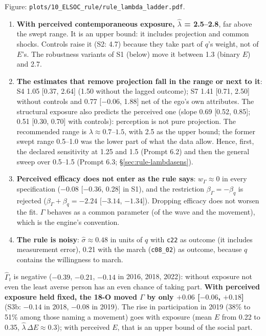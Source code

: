 \documentclass[11pt,a4paper]{article}
\newcommand{\code}[1]{\texttt{#1}}
\begin{document}
\begin{center}
\scriptsize
\setlength{\tabcolsep}{3pt}

\end{center}
\noindent Figure: \code{plots/10\_ELSOC\_rule/rule\_lambda\_ladder.pdf}.
\begin{enumerate}
  \item \textbf{With perceived contemporaneous exposure, $\hat\lambda$ = 2.5--2.8}, far above the swept range.
    It is an upper bound: it includes projection and common shocks. Controls raise it (S2: 4.7) because they
    take part of $q$'s weight, not of $E$'s. The robustness variants of S1 (below) move it between 1.3
    (binary $E$) and 2.7.
  \item \textbf{The estimates that remove projection fall in the range or next to it}: S4 1.05 [0.37, 2.64]
    (1.50 without the lagged outcome); S7 1.41 [0.71, 2.50] without controls and 0.77 [$-$0.06, 1.88] net
    of the ego's own attributes. The structural exposure also predicts the perceived one (slope 0.69
    [0.52, 0.85]; 0.51 [0.30, 0.70] with controls): perception is not pure projection. The recommended
    range is $\lambda \approx 0.7$--$1.5$, with 2.5 as the upper bound; the former swept range 0.5--1.0 was the
    lower part of what the data allow. Hence, first, the declared sensitivity at 1.25 and 1.5 (Prompt 6.2) and
    then the general sweep over 0.5--1.5 (Prompt 6.3; \S\ref{sec:rule-lambdasens}).
  \item \textbf{Perceived efficacy does not enter as the rule says}: $\hat w_\Gamma \approx 0$ in every
    specification ($-0.08$ [$-0.36$, 0.28] in S1), and the restriction $\beta_\Gamma = -\beta_q$ is rejected
    ($\beta_\Gamma + \beta_q = -2.24$ [$-3.14$, $-1.34$]). Dropping efficacy does not worsen the fit.
    $\Gamma$ behaves as a common parameter (of the wave and the movement), which is the engine's
    convention.
  \item \textbf{The rule is noisy}: $\hat\sigma \approx 0.48$ in units of $q$ with \code{c22} as outcome (it
    includes measurement error), 0.21 with the march (\code{c08\_02}) as outcome, because $q$ contains the
    willingness to march.
\end{enumerate}
$\hat\Gamma_t$ is negative ($-0.39$, $-0.21$, $-0.14$ in 2016, 2018, 2022): without exposure not even the
least averse person has an even chance of taking part. \textbf{With perceived exposure held fixed, the 18-O
moved $\Gamma$ by only $+0.06$ [$-0.06$, $+0.18$]} (S3b: $-0.14$ in 2018, $-0.08$ in 2019). The rise in
participation in 2019 (38\% to 51\% among those naming a movement) goes with exposure (mean $E$ from 0.22 to
0.35, $\hat\lambda\,\Delta E \approx 0.3$); with perceived $E$, that is an upper bound of the social part.
\end{document}
